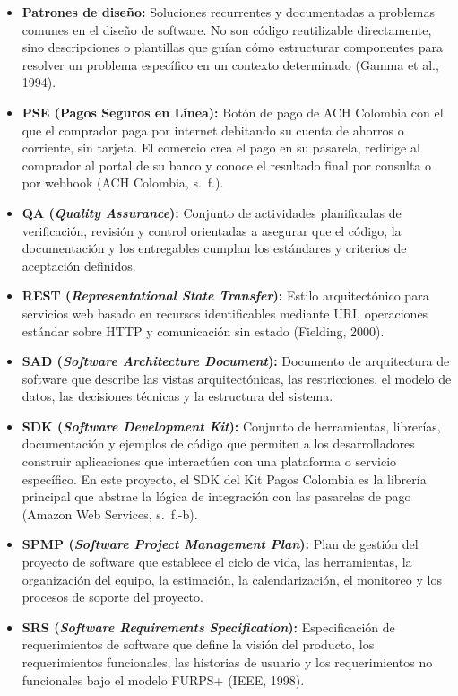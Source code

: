 \begin{itemize}
  \item \textbf{Patrones de diseño:} Soluciones recurrentes y documentadas a problemas comunes en el diseño de software. No son código reutilizable directamente, sino descripciones o plantillas que guían cómo estructurar componentes para resolver un problema específico en un contexto determinado (Gamma et al., 1994).
  \item \textbf{PSE (Pagos Seguros en Línea):} Botón de pago de ACH Colombia con el que el comprador paga por internet debitando su cuenta de ahorros o corriente, sin tarjeta. El comercio crea el pago en su pasarela, redirige al comprador al portal de su banco y conoce el resultado final por consulta o por webhook (ACH Colombia, s.~f.).
  \item \textbf{QA (\textit{Quality Assurance}):} Conjunto de actividades planificadas de verificación, revisión y control orientadas a asegurar que el código, la documentación y los entregables cumplan los estándares y criterios de aceptación definidos.
  \item \textbf{REST (\textit{Representational State Transfer}):} Estilo arquitectónico para servicios web basado en recursos identificables mediante URI, operaciones estándar sobre HTTP y comunicación sin estado (Fielding, 2000).
  \item \textbf{SAD (\textit{Software Architecture Document}):} Documento de arquitectura de software que describe las vistas arquitectónicas, las restricciones, el modelo de datos, las decisiones técnicas y la estructura del sistema.
  \item \textbf{SDK (\textit{Software Development Kit}):} Conjunto de herramientas, librerías, documentación y ejemplos de código que permiten a los desarrolladores construir aplicaciones que interactúen con una plataforma o servicio específico. En este proyecto, el SDK del Kit Pagos Colombia es la librería principal que abstrae la lógica de integración con las pasarelas de pago (Amazon Web Services, s.~f.-b).
  \item \textbf{SPMP (\textit{Software Project Management Plan}):} Plan de gestión del proyecto de software que establece el ciclo de vida, las herramientas, la organización del equipo, la estimación, la calendarización, el monitoreo y los procesos de soporte del proyecto.
  \item \textbf{SRS (\textit{Software Requirements Specification}):} Especificación de requerimientos de software que define la visión del producto, los requerimientos funcionales, las historias de usuario y los requerimientos no funcionales bajo el modelo FURPS+ (IEEE, 1998).

\end{itemize}
